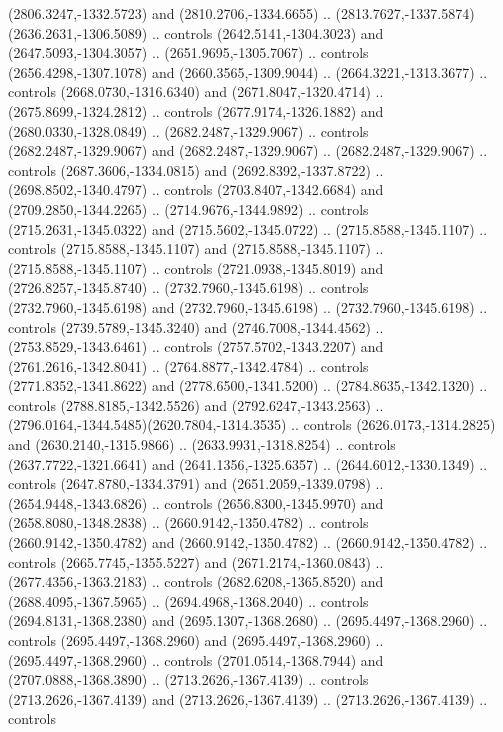 \begin{scope}[shift={(28.3138,-376.6591)}]
\begin{scope}[shift={(-2186.6262,1813.8454)}]
      (2806.3247,-1332.5723) and (2810.2706,-1334.6655) ..
      (2813.7627,-1337.5874)(2636.2631,-1306.5089) .. controls
      (2642.5141,-1304.3023) and (2647.5093,-1304.3057) .. (2651.9695,-1305.7067) ..
      controls (2656.4298,-1307.1078) and (2660.3565,-1309.9044) ..
      (2664.3221,-1313.3677) .. controls (2668.0730,-1316.6340) and
      (2671.8047,-1320.4714) .. (2675.8699,-1324.2812) .. controls
      (2677.9174,-1326.1882) and (2680.0330,-1328.0849) .. (2682.2487,-1329.9067) ..
      controls (2682.2487,-1329.9067) and (2682.2487,-1329.9067) ..
      (2682.2487,-1329.9067) .. controls (2687.3606,-1334.0815) and
      (2692.8392,-1337.8722) .. (2698.8502,-1340.4797) .. controls
      (2703.8407,-1342.6684) and (2709.2850,-1344.2265) .. (2714.9676,-1344.9892) ..
      controls (2715.2631,-1345.0322) and (2715.5602,-1345.0722) ..
      (2715.8588,-1345.1107) .. controls (2715.8588,-1345.1107) and
      (2715.8588,-1345.1107) .. (2715.8588,-1345.1107) .. controls
      (2721.0938,-1345.8019) and (2726.8257,-1345.8740) .. (2732.7960,-1345.6198) ..
      controls (2732.7960,-1345.6198) and (2732.7960,-1345.6198) ..
      (2732.7960,-1345.6198) .. controls (2739.5789,-1345.3240) and
      (2746.7008,-1344.4562) .. (2753.8529,-1343.6461) .. controls
      (2757.5702,-1343.2207) and (2761.2616,-1342.8041) .. (2764.8877,-1342.4784) ..
      controls (2771.8352,-1341.8622) and (2778.6500,-1341.5200) ..
      (2784.8635,-1342.1320) .. controls (2788.8185,-1342.5526) and
      (2792.6247,-1343.2563) .. (2796.0164,-1344.5485)(2620.7804,-1314.3535) ..
      controls (2626.0173,-1314.2825) and (2630.2140,-1315.9866) ..
      (2633.9931,-1318.8254) .. controls (2637.7722,-1321.6641) and
      (2641.1356,-1325.6357) .. (2644.6012,-1330.1349) .. controls
      (2647.8780,-1334.3791) and (2651.2059,-1339.0798) .. (2654.9448,-1343.6826) ..
      controls (2656.8300,-1345.9970) and (2658.8080,-1348.2838) ..
      (2660.9142,-1350.4782) .. controls (2660.9142,-1350.4782) and
      (2660.9142,-1350.4782) .. (2660.9142,-1350.4782) .. controls
      (2665.7745,-1355.5227) and (2671.2174,-1360.0843) .. (2677.4356,-1363.2183) ..
      controls (2682.6208,-1365.8520) and (2688.4095,-1367.5965) ..
      (2694.4968,-1368.2040) .. controls (2694.8131,-1368.2380) and
      (2695.1307,-1368.2680) .. (2695.4497,-1368.2960) .. controls
      (2695.4497,-1368.2960) and (2695.4497,-1368.2960) .. (2695.4497,-1368.2960) ..
      controls (2701.0514,-1368.7944) and (2707.0888,-1368.3890) ..
      (2713.2626,-1367.4139) .. controls (2713.2626,-1367.4139) and
      (2713.2626,-1367.4139) .. (2713.2626,-1367.4139) .. controls

\end{scope}
\end{scope}
